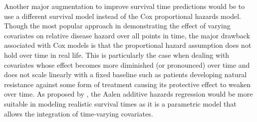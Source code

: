 \documentclass{l4proj}
\begin{document}
Another major augmentation to improve survival time predictions would be to use a different survival model instead of the Cox proportional hazards model. Though the most popular approach in demonstrating the effect of varying covariates on relative disease hazard over all points in time, the major drawback associated with Cox models is that the proportional hazard assumption does not hold over time in real life. This is particularly the case when dealing with covariates whose effect becomes more diminished (or pronounced) over time and does not scale linearly with a fixed baseline such as patients developing natural resistance against some form of treatment causing its protective effect to weaken over time. As proposed by \cite{klein2014handbook}, the Aalen additive hazards regression would be more suitable in modeling realistic survival times as it is a parametric model that allows the integration of time-varying covariates. 
\end{document}

